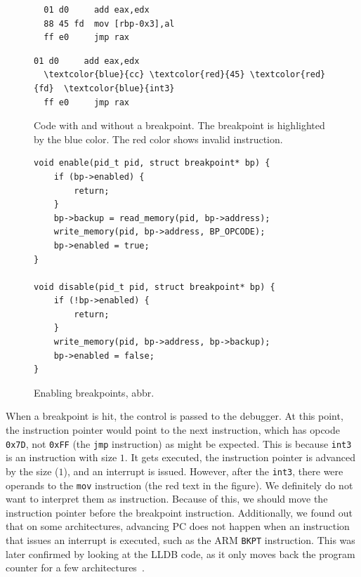 \begin{figure}
    \begin{minipage}{0.45\textwidth}
        \begin{Verbatim}
  01 d0     add eax,edx
  88 45 fd  mov [rbp-0x3],al
  ff e0     jmp rax
        \end{Verbatim}
    \end{minipage}
    \hfill\vline\hfill
    \begin{minipage}{0.45\textwidth}
        \begin{Verbatim}[commandchars=\\\{\}]
  01 d0     add eax,edx
  \textcolor{blue}{cc} \textcolor{red}{45} \textcolor{red}{fd}  \textcolor{blue}{int3}
  ff e0     jmp rax
        \end{Verbatim}
    \end{minipage}
    \caption{Code with and without a breakpoint. The breakpoint is highlighted
    by the blue color. The red color shows invalid instruction.} 
    \label{fig:with-and-without-bp}
\end{figure}

\begin{figure}
    \begin{verbatim}
void enable(pid_t pid, struct breakpoint* bp) {
    if (bp->enabled) {
        return;
    }
    bp->backup = read_memory(pid, bp->address);
    write_memory(pid, bp->address, BP_OPCODE);
    bp->enabled = true;
}

void disable(pid_t pid, struct breakpoint* bp) {
    if (!bp->enabled) {
        return;
    }
    write_memory(pid, bp->address, bp->backup);
    bp->enabled = false;
}
    \end{verbatim}
    \caption{Enabling breakpoints, abbr.}
    \label{fig:breakpoint-enable}
\end{figure}

When a breakpoint is hit, the control is passed to the debugger. At this point,
the instruction pointer would point to the next instruction, which has opcode
\texttt{0x7D}, not \texttt{0xFF} (the \texttt{jmp} instruction) as might be
expected. This is because \texttt{int3} is an instruction with size $1$. It
gets executed, the instruction pointer is advanced by the size ($1$), and an
interrupt is issued. However, after the \texttt{int3}, there were operands to
the \texttt{mov} instruction (the red text in the figure). We definitely do not
want to interpret them as instruction. Because of this, we should move the
instruction pointer before the breakpoint instruction. Additionally, we found
out that on some architectures, advancing PC does not happen when an
instruction that issues an interrupt is executed, such as the ARM \texttt{BKPT}
instruction. This was later confirmed by looking at the LLDB code, as it only
moves back the program counter for a few architectures~\cite{lldb-ip}.

